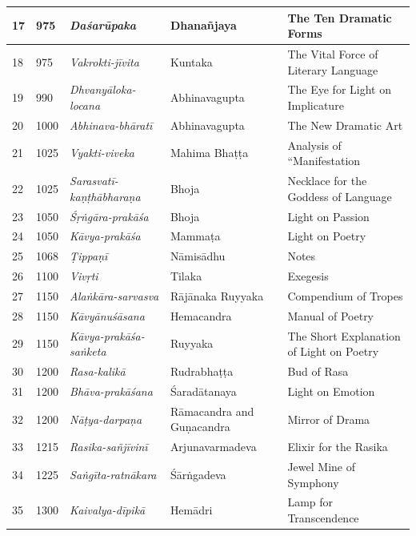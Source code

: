 \begin{longtable}{|l|p{1.1cm}|p{1.98cm}|p{1.98cm}|p{1.98cm}|}
\hline
17 & 975 & \textit{Daśarūpaka} & Dhanañjaya\index{Dhananjaya@Dhanañjaya} & The Ten Dramatic Forms \\
\hline
18 & 975 & \textit{Vakrokti-jīvita} & Kuntaka\index{Kuntaka} & The Vital Force of Literary Language \\
\hline
19 & 990 & \textit{Dhvanyāloka-locana} & Abhinavagupta\index{Abhinavagupta} & The Eye for Light on Implicature \\
\hline
20 & 1000 & \textit{Abhinava-bhāratī}\index{Abhinavabharati@Abhinava-bhāratī} & Abhinavagupta & The New Dramatic Art \\
\hline
21 & 1025 & \textit{Vyakti-viveka} & Mahima\index{Mahima Bhatta@Mahima Bhaṭṭa} Bhaṭṭa & Analysis of “Manifestation \\
\hline
22 & 1025 & \textit{Sarasvatī-kaṇṭhābharaṇa} & Bhoja\index{Bhoja} & Necklace for the Goddess of Language \\
\hline
23 & 1050 & \textit{Śṛṅgāra-prakāśa} & Bhoja & Light on Passion \\
\hline
24 & 1050 & \textit{Kāvya-prakāśa} & Mammaṭa\index{Mammata@Mammaṭa} & Light on Poetry \\
\hline
25 & 1068 & \textit{Ṭippaṇī} & Nāmisādhu\index{Namisadhu@Nāmisādhu} & Notes \\
\hline
26 & 1100 & \textit{Vivṛti} & Tilaka & Exegesis \\
\hline
27 & 1150 & \textit{Alaṅkāra-sarvasva} & Rājānaka Ruyyaka\index{Ruyyaka} & Compendium of Tropes \\
\hline
28 & 1150 & \textit{Kāvyānuśāsana} & Hemacandra\index{Hemacandra} & Manual of Poetry \\
\hline
29 & 1150 & \textit{Kāvya-prakāśa-saṅketa} & Ruyyaka & The Short Explanation of Light on Poetry \\
\hline
30 & 1200 & \textit{Rasa-kalikā} & Rudrabhaṭṭa & Bud of Rasa \\
\hline
31 & 1200 & \textit{Bhāva-prakāśana} & Śaradātanaya & Light on Emotion \\
\hline
32 & 1200 & \textit{Nāṭya-darpaṇa} & Rāmacandra and Guṇacandra\index{Gunacandra@Guṇacandra} & Mirror of Drama \\
\hline
33 & 1215 & \textit{Rasika-sañjīvinī} & Arjunavarma\-deva\index{Arjunavarmadeva} & Elixir for the Rasika \\
\hline
34 & 1225 & \textit{Saṅgīta-ratnākara} & Śārṅgadeva & Jewel Mine of Symphony \\
\hline
35 & 1300 & \textit{Kaivalya-dīpikā} & Hemādri\index{Hemadri@Hemādri} & Lamp for Transcendence \\

\end{longtable}
